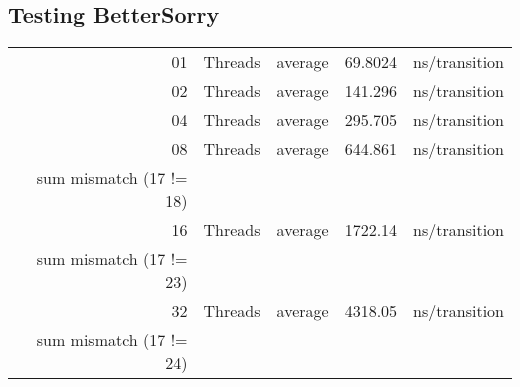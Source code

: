 \documentclass[11pt]{article}
\begin{document}
\subsection{Testing BetterSorry}
\label{sec-6-2}

\begin{center}
\begin{tabular}{rllrl}
01 & Threads & average & 69.8024 & ns/transition\\
02 & Threads & average & 141.296 & ns/transition\\
04 & Threads & average & 295.705 & ns/transition\\
08 & Threads & average & 644.861 & ns/transition\\
sum mismatch (17 != 18) &  &  &  & \\
16 & Threads & average & 1722.14 & ns/transition\\
sum mismatch (17 != 23) &  &  &  & \\
32 & Threads & average & 4318.05 & ns/transition\\
sum mismatch (17 != 24) &  &  &  & \\
\end{tabular}
\end{center}
\end{document}
